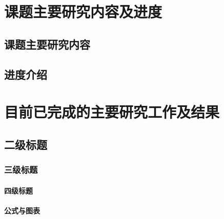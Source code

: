 \section{课题主要研究内容及进度}

\subsection{课题主要研究内容}

\lipsum[1]

\subsection{进度介绍}

\lipsum[2]

\section{目前已完成的主要研究工作及结果}

\subsection{二级标题}

\subsubsection{三级标题}

\paragraph{四级标题}

\lipsum[2]

\paragraph{公式与图表}

